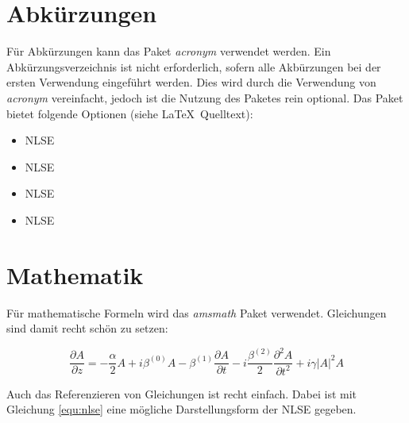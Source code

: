 \section{Abkürzungen}
Für Abkürzungen kann das Paket \textit{acronym} verwendet werden.
Ein Abkürzungsverzeichnis ist nicht erforderlich, sofern alle Akbürzungen bei der ersten Verwendung eingeführt werden.
Dies wird durch die Verwendung von \textit{acronym} vereinfacht, jedoch ist die Nutzung des Paketes rein optional.
Das Paket bietet folgende Optionen (siehe  \LaTeX~Quelltext):\par\medskip
\begin{itemize}
 \item \ac{NLSE}         %
 \item \acs{NLSE}        %
 \item \acf{NLSE}        %
 \item \acl{NLSE}        %
\end{itemize}



\section{Mathematik}
Für mathematische Formeln wird das \textit{amsmath} Paket verwendet. Gleichungen sind damit recht schön zu setzen:

\begin{equation}
\frac{{\partial A}}{{\partial z}} =  - \frac{\alpha }{2}A + i{\beta ^{(0)}}A - {\beta ^{(1)}}\frac{{\partial A}}{{\partial t}} - i\frac{{{\beta ^{(2)}}}}{2}\frac{{{\partial ^2}A}}{{\partial {t^2}}} + i\gamma {\left| A \right|^2}A
\label{equ:nlse}
\end{equation}

Auch das Referenzieren von Gleichungen ist recht einfach. Dabei ist mit Gleichung \eqref{equ:nlse} eine mögliche Darstellungsform der \acs{NLSE} gegeben.

\fi
